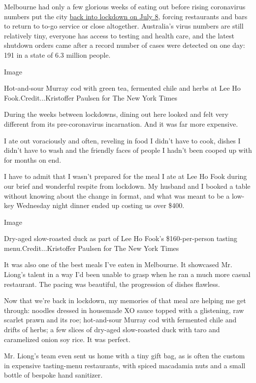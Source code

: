 Melbourne had only a few glorious weeks of eating out before rising
coronavirus numbers put the city
\href{https://www.nytimes3xbfgragh.onion/2020/07/10/world/australia/melbourne-lockdown.html}{back
into lockdown on July 8}, forcing restaurants and bars to return to
to-go service or close altogether. Australia's virus numbers are still
relatively tiny, everyone has access to testing and health care, and the
latest shutdown orders came after a record number of cases were detected
on one day: 191 in a state of 6.3 million people.

Image

Hot-and-sour Murray cod with green tea, fermented chile and herbs at Lee
Ho Fook.Credit...Kristoffer Paulsen for The New York Times

During the weeks between lockdowns, dining out here looked and felt very
different from its pre-coronavirus incarnation. And it was far more
expensive.

I ate out voraciously and often, reveling in food I didn't have to cook,
dishes I didn't have to wash and the friendly faces of people I hadn't
been cooped up with for months on end.

I have to admit that I wasn't prepared for the meal I ate at Lee Ho Fook
during our brief and wonderful respite from lockdown. My husband and I
booked a table without knowing about the change in format, and what was
meant to be a low-key Wednesday night dinner ended up costing us over
\$400.

Image

Dry-aged slow-roasted duck as part of Lee Ho Fook's \$160-per-person
tasting menu.Credit...Kristoffer Paulsen for The New York Times

It was also one of the best meals I've eaten in Melbourne. It showcased
Mr. Liong's talent in a way I'd been unable to grasp when he ran a much
more casual restaurant. The pacing was beautiful, the progression of
dishes flawless.

Now that we're back in lockdown, my memories of that meal are helping me
get through: noodles dressed in housemade XO sauce topped with a
glistening, raw scarlet prawn and its roe; hot-and-sour Murray cod with
fermented chile and drifts of herbs; a few slices of dry-aged
slow-roasted duck with taro and caramelized onion soy rice. It was
perfect.

Mr. Liong's team even sent us home with a tiny gift bag, as is often the
custom in expensive tasting-menu restaurants, with spiced macadamia nuts
and a small bottle of bespoke hand sanitizer.

